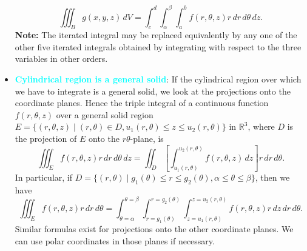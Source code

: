 \documentclass{report}
\begin{document}
\begin{itemize}
            \[
                \iiint_B g(x,y,z) \, dV = \int_c^d \int_\alpha^\beta \int_a^b f(r, \theta, z) r \, dr \, d\theta \, dz.
            \]
            \bigbreak \noindent 
            \textbf{Note:} The iterated integral may be replaced equivalently by any one of the other five iterated integrals obtained by integrating with respect to the three variables in other orders.
        \item \textbf{\textcolor{cyan}{Cylindrical region is a general solid}}:
            If the cylindrical region over which we have to integrate is a general solid, we look at the projections onto the coordinate planes. Hence the triple integral of a continuous function \(f(r, \theta, z)\) over a general solid region \(E = \{(r, \theta, z) \mid (r, \theta) \in D, u_1(r, \theta) \leq z \leq u_2(r, \theta)\}\) in \(\mathbb{R}^3\), where \(D\) is the projection of \(E\) onto the \(r\theta\)-plane, is
            \[
                \iiint_E f(r, \theta, z) r \, dr \, d\theta \, dz = \iint_D \left[ \int_{u_1(r, \theta)}^{u_2(r, \theta)} f(r, \theta, z) \, dz \right] r \, dr \, d\theta.
            \]
            In particular, if \(D = \{(r, \theta) \mid g_1(\theta) \leq r \leq g_2(\theta), \alpha \leq \theta \leq \beta\}\), then we have
            \[
                \iiint_E f(r, \theta, z) r \, dr \, d\theta = \int_{\theta=\alpha}^{\theta=\beta} \int_{r=g_1(\theta)}^{r=g_2(\theta)} \int_{z=u_1(r, \theta)}^{z=u_2(r, \theta)} f(r, \theta, z) r \, dz \, dr \, d\theta.
            \]
            Similar formulas exist for projections onto the other coordinate planes. We can use polar coordinates in those planes if necessary.


\end{itemize}
\end{document}
